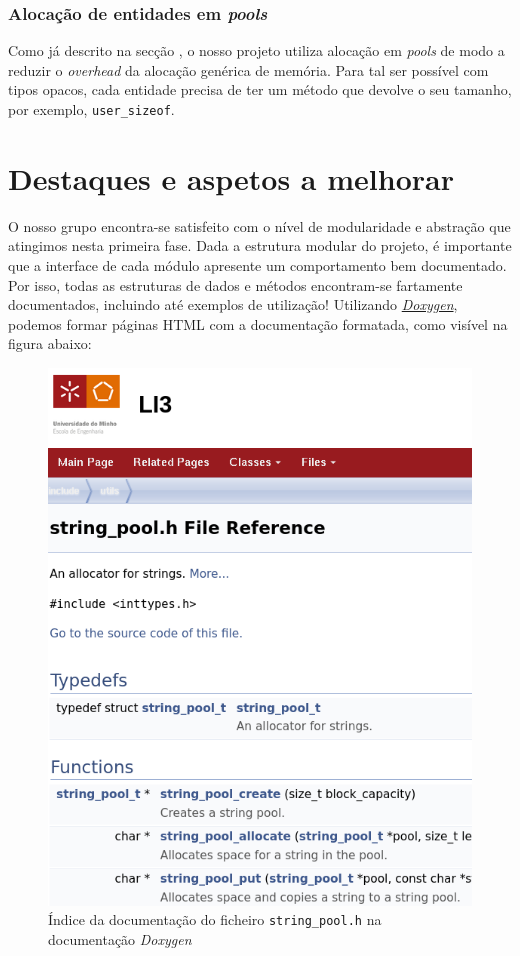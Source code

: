 \documentclass[12pt, a4paper]{article}
\begin{document}
\subsubsection{Alocação de entidades em \emph{pools}}

Como já descrito na secção , o nosso projeto utiliza alocação em \emph{pools}
de modo a reduzir o \emph{overhead} da alocação genérica de memória. Para tal ser possível com
tipos opacos, cada entidade precisa de ter um método que devolve o seu tamanho, por exemplo,
\texttt{user\_sizeof}.

\section{Destaques e aspetos a melhorar}

O nosso grupo encontra-se satisfeito com o nível de modularidade e abstração que atingimos nesta
primeira fase. Dada a estrutura modular do projeto, é importante que a interface de cada módulo
apresente um comportamento bem documentado. Por isso, todas as estruturas de dados e métodos
encontram-se fartamente documentados, incluindo até exemplos de utilização! Utilizando
\href{https://www.doxygen.nl}{\emph{Doxygen}}, podemos formar páginas HTML com a documentação
formatada, como visível na figura abaixo:

\begin{figure}[h]
    \centering
    \includegraphics[scale=0.35]{res/doxygen.png}
    \caption{Índice da documentação do ficheiro \texttt{string\_pool.h} na documentação
             \emph{Doxygen}}
    \label{fig:doxygen}
\end{figure}
\end{document}

